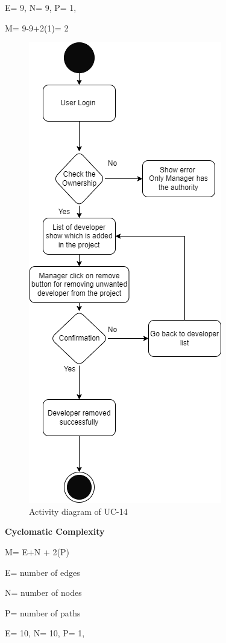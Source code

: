 E= 9,
N= 9,
P= 1,

M= 9-9+2(1)= 2

\begin{figure}[H]
    \centering
    \includegraphics[scale=0.7]{./diagrams/Activity Diagram/ad-14.png}
    \caption{Activity diagram of UC-14}
    \label{fig:act-14}

\end{figure}


\textbf{Cyclomatic Complexity}

M= E+N + 2(P)

E= number of edges

N= number of nodes

P= number of paths

E= 10,
N= 10,
P= 1,

